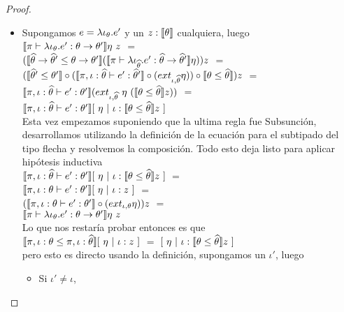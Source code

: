 \begin{proof}
\begin{itemize}
\begin{itemize}
\item Supongamos $e = \lambda \iota_{\theta} . e'$ y un $z : \llbracket \theta \rrbracket$ cualquiera, luego\\

$\semBrcks{\pi \vdash \clambda{\iota}{\theta}{e'} : \theta \rightarrow \theta'}\eta \ z$ $=$\\
$(\llbracket \widehat{\theta} \rightarrow \widehat{\theta}' \leq \theta \rightarrow \theta' \rrbracket
(\llbracket \pi \vdash \lambda \iota_{\widehat{\theta}} . e' : \widehat{\theta} \rightarrow \widehat{\theta}' \rrbracket\eta))z$
$=$\\
$(\llbracket \widehat{\theta}' \leq \theta' \rrbracket 
	\circ
(\llbracket \pi,\iota:\widehat{\theta} \vdash e' : \widehat{\theta}' \rrbracket \circ (ext_{\iota,\widehat{\theta}}\eta))
	\circ
\llbracket \theta \leq \widehat{\theta} \rrbracket) z$ $=$\\
$\llbracket \pi,\iota:\widehat{\theta} \vdash e' : \theta' \rrbracket
		(ext_{\iota,\widehat{\theta}} \ \eta \ (\llbracket \theta \leq \widehat{\theta} \rrbracket z))$ $=$\\
$\semBrcks{\pi,\iota:\thetahat \vdash e' : \theta'}
		[ \ \eta \ | \ \iota:\semBrcks{\theta \leq \thetahat}z \ ]$\\

Esta vez empezamos suponiendo que la ultima regla fue Subsunción, desarrollamos
utilizando la definici\'on de la ecuaci\'on para el subtipado del tipo flecha y
resolvemos la composici\'on. Todo esto deja listo para aplicar hip\'otesis inductiva\\

$\semBrcks{\pi,\iota:\thetahat \vdash e' : \theta'}
		[ \ \eta \ | \ \iota:\semBrcks{\theta \leq \thetahat}z \ ]$ $=$\\
$\llbracket \pi,\iota:\theta \vdash e' : \theta' \rrbracket [ \ \eta \ | \ \iota:z \ ]$ $=$\\
$(\llbracket \pi,\iota:\theta \vdash e' : \theta' \rrbracket \circ (ext_{\iota,\theta} \eta)) z$ $=$\\
$\semBrcks{\pi \vdash \clambda{\iota}{\theta}{e'} : \theta \rightarrow \theta'}\eta \ z$\\

Lo que nos restar\'ia probar entonces es que\\

$\llbracket \pi,\iota:\theta \leq \pi,\iota:\widehat{\theta} \rrbracket[ \ \eta \ | \ \iota:z \ ]$ $=$
$[ \ \eta \ | \ \iota:\llbracket \theta \leq \widehat{\theta} \rrbracket z \ ]$\\

pero esto es directo usando la definici\'on, supongamos un $\iota'$, luego

\begin{itemize}
\item Si $\iota' \neq \iota$, \\


\end{itemize}
\end{itemize}
\end{itemize}
\end{proof}
